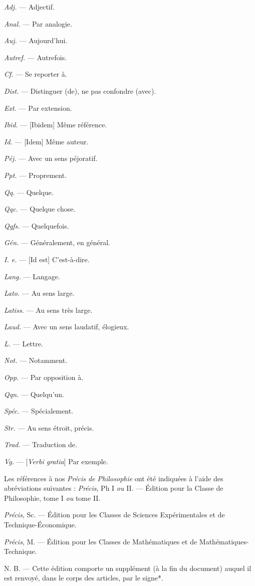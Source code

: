 \begin{minipage}[c]{.45\linewidth}
{\it Adj.} — Adjectif.

{\it Anal.} — Par analogie.

{\it Auj.} — Aujourd'hui.

{\it Autref.} — Autrefois.

{\it Cf.} — Se reporter à.

{\it Dist.} — Distinguer (de), ne pas confondre (avec).

{\it Ext.} — Par extension.

{\it Ibid.} — [{\it }Ibidem] Même référence.

{\it Id.} — [{\it }Idem] Même auteur.

{\it Péj.} — Avec un sens péjoratif.

{\it Ppt.} — Proprement.

{\it Qq.} — Quelque.

{\it Qqc.} — Quelque chose.

{\it Qgfs.} — Quelquefois.
\end{minipage}
\hfill
\begin{minipage}[c]{.45\linewidth}
{\it Gén.} — Généralement, en général.

{\it I. e.} — [{\it }Id est] C'est-à-dire.

{\it Lang.} — Langage.

{\it Lato.} — Au sens large.

{\it Latiss.} — Au sens très large.

{\it Laud.} — Avec un sens laudatif, élogieux.

{\it L.} — Lettre.

{\it Not.} — Notamment.

{\it Opp.} — Par opposition à.

{\it Qqn.} — Quelqu'un.

{\it Spéc.} — Spécialement.

{\it Str.} — Au sens étroit, précis.

{\it Trad.} — Traduction de.

{\it Vg.} — [{\it Verbi gratia}] Par exemple.
\end{minipage}

\vspace{0.211cm}
Les références à nos {\it Précis de Philosophie} ont été indiquées à l’aide des
abréviations suivantes :
{\it Précis}, Ph I {\it ou} II. — Édition pour la Classe de Philosophie, tome I {\it ou} tome II.

{\it Précis}, Sc. — Édition pour les Classes de Sciences Expérimentales et de
Technique-Économique.

{\it Précis}, M. — Édition pour les Classes de Mathématiques et de
Mathématiques-Technique.

\vspace{0.211cm}
N. B. — Cette édition comporte un supplément (à la fin du document) auquel
il est renvoyé, dans le corps des articles, par le signe*.


